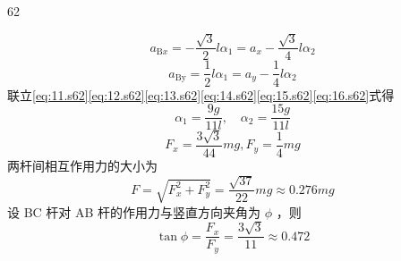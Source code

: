 \begin{solution}{62}
\begin{subsolution}
        \begin{equation}
            a _ {\mathrm{B} x} = - \frac {\sqrt {3}}{2} l \alpha_{1} = a _ {x} - \frac {\sqrt {3}}{4} l \alpha_{2}
            \label{eq:15.s62}
        \end{equation}
        \begin{equation}
            a _ {\mathrm{By}} = \frac {1}{2} l \alpha_{1} = a _ {y} - \frac {1}{4} l \alpha_{2}
            \label{eq:16.s62}
        \end{equation}
        联立\eqref{eq:11.s62}\eqref{eq:12.s62}\eqref{eq:13.s62}\eqref{eq:14.s62}\eqref{eq:15.s62}\eqref{eq:16.s62}式得
        \begin{equation}
            \alpha_{1} = \frac {9 g}{11 l}, \quad \alpha_{2} = \frac {15 g}{11 l}
            \label{eq:17.s62}
        \end{equation}
        \begin{equation}
            F _ {x} = \frac {3 \sqrt {3}}{44} m g, F _ {y} = \frac {1}{4} m g
            \label{eq:18.s62}
        \end{equation}
        两杆间相互作用力的大小为
        \begin{equation}
            F = \sqrt {F _ {x}^{2} + F _ {y}^{2}} = \frac {\sqrt {37}}{22} m g \approx 0.276 m g
            \label{eq:19.s62}
        \end{equation}
        设 BC 杆对 AB 杆的作用力与竖直方向夹角为 $\phi$ ，则
        \begin{equation}
            \tan \phi = \frac {F _ {x}}{F _ {y}} = \frac {3 \sqrt {3}}{11} \approx 0.472
            \label{eq:20.s62}
        \end{equation}
    \end{subsolution}
\end{solution}